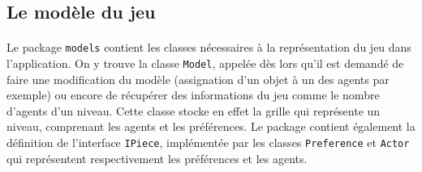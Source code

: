 \documentclass[../main.tex]{subfiles}
\begin{document}
	\subsection{Le modèle du jeu}

\paragraph{}
Le package \texttt{models} contient les classes nécessaires à la représentation du jeu dans l'application. On y trouve la classe \texttt{Model}, appelée dès lors qu'il est demandé de faire une modification du modèle (assignation d'un objet à un des agents par exemple) ou encore de récupérer des informations du jeu comme le nombre d'agents d'un niveau. Cette classe stocke en effet la grille qui représente un niveau, comprenant les agents et les préférences. Le package contient également la définition de l'interface \texttt{IPiece}, implémentée par les classes \texttt{Preference} et \texttt{Actor} qui représentent respectivement les préférences et les agents.
\end{document}

